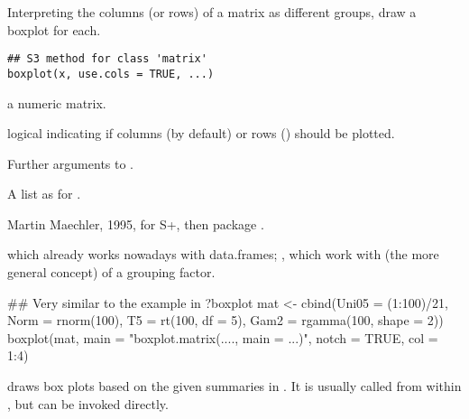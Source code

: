 %
\begin{Description}\relax
Interpreting the columns (or rows) of a matrix as different groups, draw a
boxplot for each.
\end{Description}
%
\begin{Usage}
\begin{verbatim}
## S3 method for class 'matrix'
boxplot(x, use.cols = TRUE, ...)
\end{verbatim}
\end{Usage}
%
\begin{Arguments}
\begin{ldescription}
\item[\code{x}] a numeric matrix.
\item[\code{use.cols}] logical indicating if columns (by default) or rows
() should be plotted.
\item[\code{...}] Further arguments to .
\end{ldescription}
\end{Arguments}
%
\begin{Value}
A list as for .
\end{Value}
%
\begin{Author}\relax
Martin Maechler, 1995, for S+, then \R{} package .
\end{Author}
%
\begin{SeeAlso}\relax
{} which already works nowadays with
data.frames; ,  which
work with (the more general concept) of a grouping factor.
\end{SeeAlso}
%
\begin{Examples}
\begin{ExampleCode}
## Very similar to the example in ?boxplot
mat <- cbind(Uni05 = (1:100)/21, Norm = rnorm(100),
             T5 = rt(100, df = 5), Gam2 = rgamma(100, shape = 2))
boxplot(mat, main = "boxplot.matrix(...., main = ...)",
        notch = TRUE, col = 1:4)
\end{ExampleCode}
\end{Examples}
%
\begin{Description}\relax
{} draws box plots based on the given summaries in .
It is usually called from within , but can be
invoked directly.
\end{Description}
